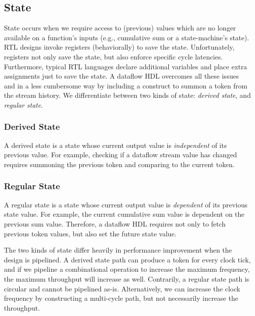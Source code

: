 \subsection{State}
State occurs when we require access to (previous) values which are no longer available on a function's inputs (e.g., cumulative sum or a state-machine's state). RTL designs invoke registers (behaviorally) to save the state. Unfortunately, registers not only save the state, but also enforce specific cycle latencies. Furthermore, typical RTL languages declare additional variables and place extra assignments just to save the state. A dataflow HDL overcomes all these issues and in a less cumbersome way by including a construct to summon a token from the stream history.
We differentiate between two kinds of state: \textit{derived state}, and \textit{regular state}. 


\subsubsection{Derived State} 
A derived state is a state whose current output value is \textit{independent} of its previous value. For example, checking if a dataflow stream value has changed requires summoning the previous token and comparing to the current token. 

\subsubsection{Regular State} 
A regular state is a state whose current output value is \textit{dependent} of its previous state value. For example, the current cumulative sum value is dependent on the previous sum value. Therefore, a dataflow HDL requires not only to fetch previous token values, but also set the future state value.

The two kinds of state differ heavily in performance improvement when the design is pipelined. A derived state path can produce a token for every clock tick, and if we pipeline a combinational operation to increase the maximum frequency, the maximum throughput will increase as well. Contrarily, a regular state path is circular and cannot be pipelined as-is. Alternatively, we can increase the clock frequency by constructing a multi-cycle path, but not necessarily increase the throughput.

